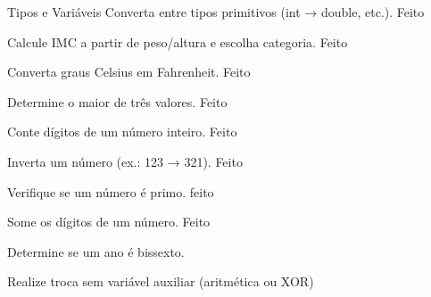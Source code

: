 Tipos e Variáveis
Converta entre tipos primitivos (int → double, etc.). Feito

Calcule IMC a partir de peso/altura e escolha categoria. Feito

Converta graus Celsius em Fahrenheit. Feito

Determine o maior de três valores. Feito

Conte dígitos de um número inteiro. Feito

Inverta um número (ex.: 123 → 321). Feito

Verifique se um número é primo. feito

Some os dígitos de um número. Feito

Determine se um ano é bissexto.

Realize troca sem variável auxiliar (aritmética ou XOR)